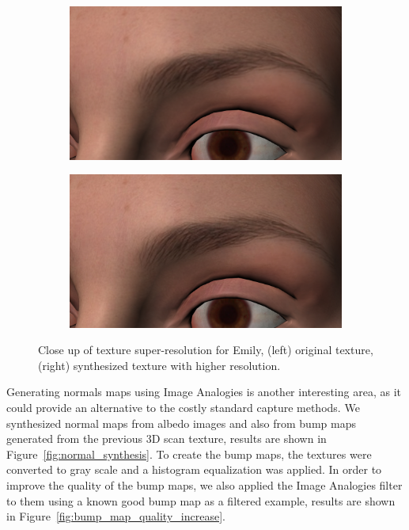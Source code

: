 \begin{figure}
        \centering
        \begin{subfigure}[b]{0.48\textwidth}
                \includegraphics[width=\textwidth]{img/emily_close_original}
        \end{subfigure}
        \begin{subfigure}[b]{0.48\textwidth}
                \includegraphics[width=\textwidth]{img/emily_close_sr}
        \end{subfigure}
        \caption{Close up of texture super-resolution for Emily, (left) original texture, (right) synthesized texture with higher resolution.}
\end{figure}

Generating normals maps using Image Analogies is another interesting area, as it could provide an alternative to the costly standard capture methods.
We synthesized normal maps from albedo images and also from bump maps generated from the previous 3D scan texture, results are shown in Figure~\ref{fig:normal_synthesis}.
To create the bump maps, the textures were converted to gray scale and a histogram equalization was applied.
In order to improve the quality of the bump maps, we also applied the Image Analogies filter to them using a known good bump map as a filtered example, results are shown in Figure~\ref{fig:bump_map_quality_increase}.

